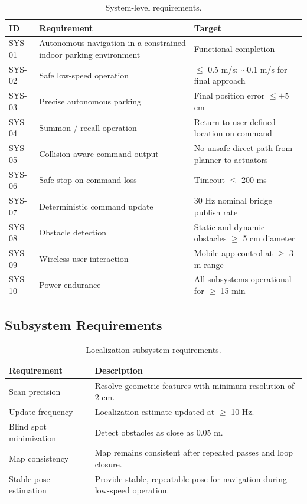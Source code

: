 \documentclass[12pt,a4paper]{report}
\begin{document}
\begin{table}[H]
\centering
\caption{System-level requirements.}
\label{tab:sys_req}
\begin{tabularx}{\textwidth}{|p{1.7cm}|X|p{3cm}|}
\hline
\textbf{ID} & \textbf{Requirement} & \textbf{Target} \\
\hline
SYS-01 & Autonomous navigation in a constrained indoor parking environment & Functional completion \\
\hline
SYS-02 & Safe low-speed operation & $\leq$ 0.5 m/s; $\sim$0.1 m/s for final approach \\
\hline
SYS-03 & Precise autonomous parking & Final position error $\leq \pm$5 cm \\
\hline
SYS-04 & Summon / recall operation & Return to user-defined location on command \\
\hline
SYS-05 & Collision-aware command output & No unsafe direct path from planner to actuators \\
\hline
SYS-06 & Safe stop on command loss & Timeout $\leq$ 200 ms \\
\hline
SYS-07 & Deterministic command update & 30 Hz nominal bridge publish rate \\
\hline
SYS-08 & Obstacle detection & Static and dynamic obstacles $\geq$ 5 cm diameter \\
\hline
SYS-09 & Wireless user interaction & Mobile app control at $\geq$ 3 m range \\
\hline
SYS-10 & Power endurance & All subsystems operational for $\geq$ 15 min \\
\hline
\end{tabularx}
\end{table}

\subsection{Subsystem Requirements}

\begin{table}[H]
\centering
\caption{Localization subsystem requirements.}
\label{tab:loc_req}
\begin{tabularx}{\textwidth}{|p{4cm}|X|}
\hline
\textbf{Requirement} & \textbf{Description} \\
\hline
Scan precision & Resolve geometric features with minimum resolution of 2 cm. \\
\hline
Update frequency & Localization estimate updated at $\geq$ 10 Hz. \\
\hline
Blind spot minimization & Detect obstacles as close as 0.05 m. \\
\hline
Map consistency & Map remains consistent after repeated passes and loop closure. \\
\hline
Stable pose estimation & Provide stable, repeatable pose for navigation during low-speed operation. \\
\hline
\end{tabularx}
\end{table}
\end{document}
